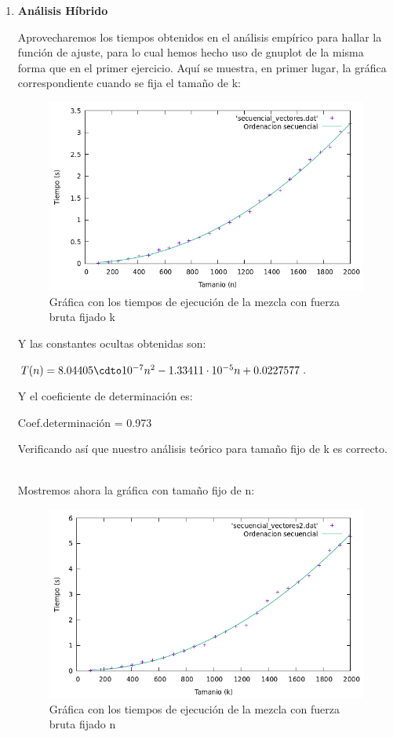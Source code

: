 \documentclass[10pt,a4paper]{article}
\begin{document}
\begin{enumerate}
	\item \textbf{Análisis Híbrido}
	
	Aprovecharemos los tiempos obtenidos en el análisis empírico para hallar la función de ajuste, para lo cual hemos hecho uso de gnuplot de la misma forma que en el primer ejercicio. Aquí se muestra, en primer lugar, la gráfica correspondiente cuando se fija el tamaño de k:
	
	\begin{figure}[h!]
		\centering
		\includegraphics[scale=0.55]{./Images/Grafica_eje2_fijoksec.png}
		\caption{Gráfica con los tiempos de ejecución de la mezcla con fuerza bruta fijado k}
	\end{figure}

	Y las constantes ocultas obtenidas son:
	
	\( T(n) = 8.04405\cdto10^{-7} n^2 - 1.33411\cdot10^{-5}n + 0.0227577\).
	
	Y el coeficiente de determinación es:
	
	Coef.determinación = 0.973
	
	Verificando así que nuestro análisis teórico para tamaño fijo de k es correcto.

\\
	Mostremos ahora la gráfica con tamaño fijo de n:
	
	\begin{figure}[h!]
		\centering
		\includegraphics[scale=0.55]{./Images/Grafica_eje2_fijonsec.png}
		\caption{Gráfica con los tiempos de ejecución de la mezcla con fuerza bruta fijado n}
	\end{figure}


\end{enumerate}
\end{document}
